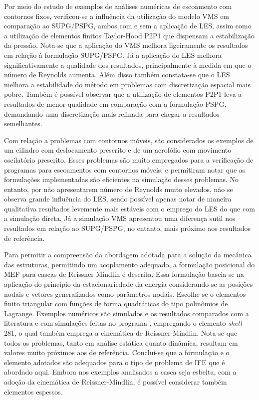 Por meio do estudo de exemplos de análises numéricas de escoamento com contornos fixos, verificou-se a influência da utilização do modelo VMS em comparação ao SUPG/PSPG, ambos com e sem a aplicação de LES, assim como a utilização de elementos finitos Taylor-Hood P2P1 que dispensam a estabilização da pressão. Nota-se que a aplicação do VMS melhora ligeiramente os resultados em relação à formulação SUPG/PSPG. Já a aplicação do LES melhora significativamente a qualidade dos resultados, principalmente à medida em que o número de Reynolds aumenta. Além disso também constata-se que o LES melhora a estabilidade do método em problemas com discretização espacial mais pobre. Também é possível observar que a utilização de elementos P2P1 leva a resultados de menor qualidade em comparação com a formulação PSPG, demandando uma discretização mais refinada para chegar a resultados semelhantes.

Com relação a problemas com contornos móveis, são considerados os exemplos de um cilindro com deslocamento prescrito e de um aerofólio com movimento oscilatório prescrito. Esses problemas são muito empregados para a verificação de programas para escoamentos com contornos móveis, e permitiram notar que as formulações implementadas são eficientes na simulação desses problemas. No entanto, por não apresentarem número de Reynolds muito elevados, não se observa grande influência do LES, sendo possível apenas notar de maneira qualitativa resultados levemente mais estáveis com o emprego do LES do que com a simulação direta. Já a simulação VMS apresentou uma diferença sutil nos resultados em relação ao SUPG/PSPG, no entanto, mais próximo aos resultados de referência.

Para permitir a compreensão da abordagem adotada para a solução da mecânica das estruturas, permitindo um acoplamento adequado, a formulação posicional do MEF para cascas de Reissner-Mindlin é descrita. Essa formulação baseia-se na aplicação do princípio da estacionariedade da energia considerando-se as posições nodais e vetores generalizados como parâmetros nodais. Escolhe-se o elementos finito triangular com funções de forma quadráticas do tipo polinômios de Lagrange. Exemplos numéricos são simulados e os resultados comparados com a literatura e com simulações feitas no programa , empregando o elemento \textit{shell} 281, o qual também emprega a cinemática de Reissner-Mindlin. Nota-se que todos os problemas, tanto em análise estática quanto dinâmica, resultam em valores muito próximos aos de referência. Conclui-se que a formulação e o elemento adotados são adequados para o tipo de problema de IFE que é abordado aqui. Embora nos exemplos analisados a casca seja esbelta, com a adoção da cinemática de Reissner-Mindlin, é possível considerar também elementos espessos.

